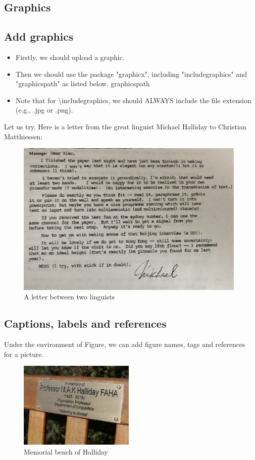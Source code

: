 \documentclass[12pt, letterpaper]{article}
\begin{document}
\begin{spacing}{1.3}
\section{Graphics}
\subsection{Add graphics}
\begin{itemize}
    \item Firstly, we should upload a graphic. 
    \item Then we should use the package "graphicx", including "includegraphics" and "graphicspath" as listed below. graphicspath{}
    \item Note that for \textbackslash includegraphics, we should ALWAYS include the file extension (e.g., .jpg or .png).
\end{itemize}
Let us try.
Here is a letter from the great linguist Michael Halliday to Christian Matthiessen:

\begin{figure}[H] %
    \centering
    \includegraphics[width=0.5\linewidth]{A letter.jpg}
    \caption{A letter between two linguists}
    \label{fig:mesh1}
\end{figure}


\subsection{Captions, labels and references}
Under the environment of Figure, we can add figure names, tags and references for a picture.
\begin{figure}[H]
    \centering
    \includegraphics[width=0.5\textwidth]{Memo.jpg}
    \caption{Memorial bench of Halliday}
    \label{fig:mesh2}
\end{figure}


\end{spacing}
\end{document}
